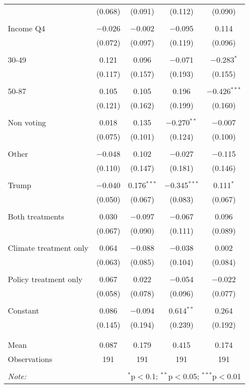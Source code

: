 \begin{tabular}{@{\extracolsep{5pt}}lcccc}
  & (0.068) & (0.091) & (0.112) & (0.090) \\ 
  & & & & \\ 
 Income Q4 & $-$0.026 & $-$0.002 & $-$0.095 & 0.114 \\ 
  & (0.072) & (0.097) & (0.119) & (0.096) \\ 
  & & & & \\ 
 30-49 & 0.121 & 0.096 & $-$0.071 & $-$0.283$^{*}$ \\ 
  & (0.117) & (0.157) & (0.193) & (0.155) \\ 
  & & & & \\ 
 50-87 & 0.105 & 0.105 & 0.196 & $-$0.426$^{***}$ \\ 
  & (0.121) & (0.162) & (0.199) & (0.160) \\ 
  & & & & \\ 
 Non voting & 0.018 & 0.135 & $-$0.270$^{**}$ & $-$0.007 \\ 
  & (0.075) & (0.101) & (0.124) & (0.100) \\ 
  & & & & \\ 
 Other & $-$0.048 & 0.102 & $-$0.027 & $-$0.115 \\ 
  & (0.110) & (0.147) & (0.181) & (0.146) \\ 
  & & & & \\ 
 Trump & $-$0.040 & 0.176$^{***}$ & $-$0.345$^{***}$ & 0.111$^{*}$ \\ 
  & (0.050) & (0.067) & (0.083) & (0.067) \\ 
  & & & & \\ 
 Both treatments & 0.030 & $-$0.097 & $-$0.067 & 0.096 \\ 
  & (0.067) & (0.090) & (0.111) & (0.089) \\ 
  & & & & \\ 
 Climate treatment only & 0.064 & $-$0.088 & $-$0.038 & 0.002 \\ 
  & (0.063) & (0.085) & (0.104) & (0.084) \\ 
  & & & & \\ 
 Policy treatment only & 0.067 & 0.022 & $-$0.054 & $-$0.022 \\ 
  & (0.058) & (0.078) & (0.096) & (0.077) \\ 
  & & & & \\ 
 Constant & 0.086 & $-$0.094 & 0.614$^{**}$ & 0.264 \\ 
  & (0.145) & (0.194) & (0.239) & (0.192) \\ 
  & & & & \\ 
\hline \\[-1.8ex] 
Mean & 0.087 & 0.179 & 0.415 & 0.174 \\ 
Observations & 191 & 191 & 191 & 191 \\ 
\hline 
\hline \\[-1.8ex] 
\textit{Note:}  & \multicolumn{4}{r}{$^{*}$p$<$0.1; $^{**}$p$<$0.05; $^{***}$p$<$0.01} \\ 
\end{tabular} 
